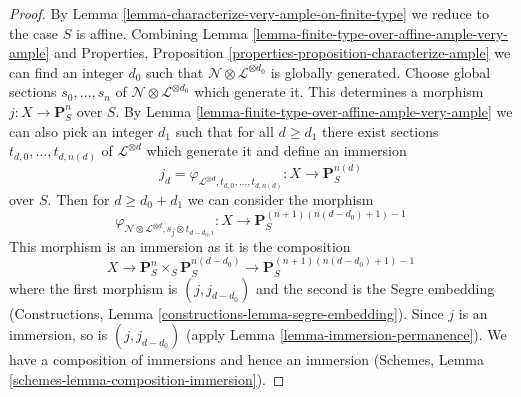 \begin{proof}
By Lemma \ref{lemma-characterize-very-ample-on-finite-type}
we reduce to the case $S$ is affine. Combining
Lemma \ref{lemma-finite-type-over-affine-ample-very-ample} and
Properties, Proposition \ref{properties-proposition-characterize-ample}
we can find an integer $d_0$ such that
$\mathcal{N} \otimes \mathcal{L}^{\otimes d_0}$
is globally generated. Choose global sections
$s_0, \ldots, s_n$ of $\mathcal{N} \otimes \mathcal{L}^{\otimes d_0}$
which generate it. This determines a morphism
$j : X \to \mathbf{P}^n_S$ over $S$. By
Lemma \ref{lemma-finite-type-over-affine-ample-very-ample}
we can also pick an integer $d_1$ such that for all $d \geq d_1$
there exist sections $t_{d, 0}, \ldots, t_{d, n(d)}$
of $\mathcal{L}^{\otimes d}$ which generate it and define
an immersion
$$
j_d = \varphi_{\mathcal{L}^{\otimes d}, t_{d, 0}, \ldots, t_{d, n(d)}} :
X
\longrightarrow
\mathbf{P}^{n(d)}_S
$$
over $S$. Then for $d \geq d_0 + d_1$ we can consider the
morphism
$$
\varphi_{\mathcal{N} \otimes \mathcal{L}^{\otimes d},
s_j \otimes t_{d - d_0, i}} :
X
\longrightarrow
\mathbf{P}^{(n + 1)(n(d - d_0) + 1) - 1}_S
$$
This morphism is an immersion as it is the composition
$$
X \to \mathbf{P}^n_S \times_S \mathbf{P}^{n(d - d_0)}_S
\to \mathbf{P}^{(n + 1)(n(d - d_0) + 1) - 1}_S
$$
where the first morphism is $(j, j_{d - d_0})$ and
the second is the Segre embedding
(Constructions, Lemma \ref{constructions-lemma-segre-embedding}).
Since $j$ is an immersion, so is $(j, j_{d - d_0})$
(apply Lemma \ref{lemma-immersion-permanence}). We have a composition of
immersions and hence an immersion
(Schemes, Lemma \ref{schemes-lemma-composition-immersion}).
\end{proof}










